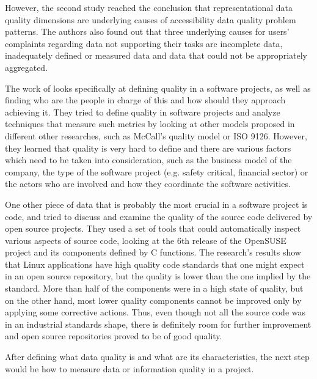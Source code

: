 \documentclass{mprop}
\begin{document}
However, the second study reached the conclusion that representational data 
quality dimensions are underlying causes of accessibility data quality problem
patterns. The authors also found out that three underlying causes for users'
complaints regarding data not supporting their tasks are incomplete data, 
inadequately defined or measured data and data that could not be appropriately
aggregated.

The work of \citet{kitchenham1996software} looks specifically at defining
quality in a software projects, as well as finding who are the people in charge of 
this and how should they approach achieving it. They tried to define quality 
in software projects and analyze techniques that measure such metrics by looking
at other models proposed in different other researches, such as McCall's quality
model or ISO 9126. However, they learned that quality is very hard to define and
there are various factors which need to be taken into consideration, such as the
business model of the company, the type of the software project (e.g. safety 
critical, financial sector) or the actors who are involved and how they coordinate
the software activities.

One other piece of data that is probably the most crucial in a software project
is code, and \citet{stamelos2002code} tried to discuss and examine the quality
of the source code delivered by open source projects. They used a set of tools
that could automatically inspect various aspects of source code, looking at
the 6th release of the OpenSUSE project and its components defined by C
functions. The research's results show that Linux applications have high quality 
code standards that one might expect in an open source repository, but 
the quality is lower than the one implied by the standard. More than half
of the components were in a high state of quality, but on the other hand, 
most lower quality components cannot be improved only by applying some
corrective actions. Thus, even though not all the source code was in 
an industrial standards shape, there is definitely room for further 
improvement and open source repositories proved to be of good quality.

After defining what data quality is and what are its characteristics, the next 
step would be how to measure data or information quality in a project. 
\end{document}
